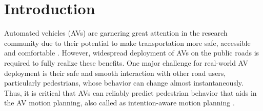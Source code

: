 \documentclass[letter,journal]{IEEEtran}
\begin{document}







%
\IEEEpeerreviewmaketitle

% 
% 
% 
% 

 


\section{Introduction}

% 



Automated vehicles (AVs) are garnering great attention in the research community due to their potential to make transportation more safe, accessible and comfortable \cite{litman2017autonomous}. However, widespread deployment of AVs on the public roads is required to fully realize these benefits. One major challenge for real-world AV deployment is their safe and smooth interaction with other road users, particularly pedestrians, whose behavior can change almost instantaneously. Thus, it is critical that AVs can reliably predict pedestrian behavior that aids in the AV motion planning, also called as intention-aware motion planning \cite{bandyopadhyay2013intention}. \\
\end{document}
